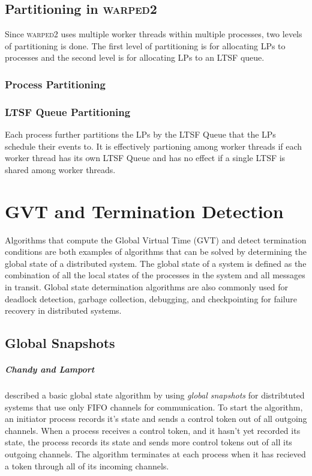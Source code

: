 \documentclass[11pt]{book}
\begin{document}
\section{Partitioning in \textsc{warped2}}

Since \textsc{warped2} uses multiple worker threads within multiple processes, two levels
of partitioning is done. The first level of partitioning is for allocating LPs to processes
and the second level is for allocating LPs to an LTSF queue.

\subsection{Process Partitioning}



\subsection{LTSF Queue Partitioning}

Each process further partitions the LPs by the LTSF Queue that the LPs schedule their
events to. It is effectively partioning among worker threads if each worker thread has its
own LTSF Queue and has no effect if a single LTSF is shared among worker threads.


\chapter{GVT and Termination Detection}\label{gvt_termination}

Algorithms that compute the Global Virtual Time (GVT) and detect termination conditions are
both examples of algorithms that can be solved by determining the global state of a
distributed system. The global state of a system is defined as the combination of all
the local states of the processes in the system and all messages in transit. Global state
determination algorithms are also commonly used for deadlock detection, garbage collection,
debugging, and checkpointing for failure recovery in distributed systems.

\section{Global Snapshots}

\paragraph{Chandy and Lamport}\cite{chandy-85} described a basic global state algorithm by
using \emph{global snapshots} for distribtuted systems that use only FIFO channels for
communication. To start the algorithm, an initiator process records it's state and sends
a control token out of all outgoing channels. When a process receives a control token, and
it hasn't yet recorded its state, the process records its state and sends more control
tokens out of all its outgoing channels. The algorithm terminates at each process when it
has recieved a token through all of its incoming channels.
\end{document}
